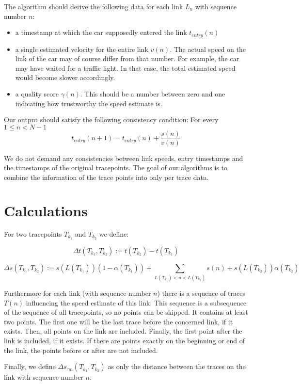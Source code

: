 \documentclass{scrartcl}
\begin{document}
The algorithm should derive the following data for each link $L_n$ with sequence number $n$:

\begin{itemize}
  \item a timestamp at which the car supposedly entered the link $t_{entry}(n)$
  \item a single estimated velocity for the entire link $v(n)$.
    The actual speed on the link of the car may of course differ from that number.
    For example, the car may have waited for a traffic light.
    In that case, the total estimated speed would become slower accordingly.
  \item a quality score $\gamma(n)$.
    This should be a number between zero and one indicating how trustworthy the speed estimate is.
\end{itemize}

Our output should satisfy the following consistency condition:
For every ${1 \le n < N - 1}$
\[
t_{entry}(n + 1) = t_{entry}(n) + \frac{s(n)}{v(n)}
\]

We do not demand any consistencies between link speeds, entry timestamps and the timestamps of the original tracepoints.
The goal of our algorithms is to combine the information of the trace points into only per trace data.

\section{Calculations}

For two tracepoints $T_{k_1}$ and $T_{k_2}$ we define:

\[ \Delta t(T_{k_1}, T_{k_2}) := t(T_{k_2}) - t(T_{k_1}) \]

\[ \Delta s(T_{k_1}, T_{k_2}) := s(L(T_{k_1})) (1 - \alpha(T_{k_1})) + \sum_{L(T_{k_1}) < n < L(T_{k_2})} s(n) + s(L(T_{k_2})) \alpha(T_{k_2}) \]

Furthermore for each link (with sequence number $n$) there is a sequence of traces $T(n)$ influencing the speed estimate of this link.
This sequence is a subsequence of the sequence of all tracepoints, so no points can be skipped.
It contains at least two points.
The first one will be the last trace before the concerned link, if it exists.
Then, all points on the link are included.
Finally, the first point after the link is included, if it exists.
If there are points exactly on the beginning or end of the link, the points before or after are not included.

Finally, we define $\Delta s_{\cap n}(T_{k_1}, T_{k_2})$ as only the distance between the traces on the link with sequence number $n$.
\end{document}
